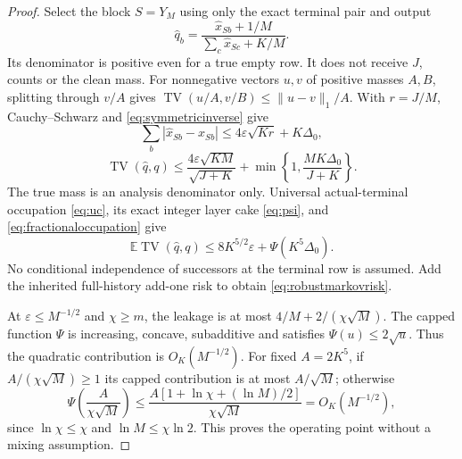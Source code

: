 \documentclass[11pt,letterpaper]{article}
\theoremstyle{definition}\newtheorem{definition}[theorem]{Definition}
\theoremstyle{remark}\newtheorem{remark}[theorem]{Remark}
\newcommand{\TV}{\operatorname{TV}}
\newcommand{\E}{\mathbb{E}}
\begin{document}
\begin{proof}
Select the block $S=Y_M$ using only the exact terminal pair and output
\[
 \widehat q_b=\frac{\widehat x_{Sb}+1/M}{\sum_c\widehat x_{Sc}+K/M}.
\]
Its denominator is positive even for a true empty row. It does not receive $J$, counts or the clean mass. For nonnegative vectors $u,v$ of positive masses $A,B$, splitting through $v/A$ gives
$\TV(u/A,v/B)\le\|u-v\|_1/A$.
With $r=J/M$, Cauchy--Schwarz and \eqref{eq:symmetricinverse} give
\[
 \sum_b|\widehat x_{Sb}-x_{Sb}|
 \le4\varepsilon\sqrt{Kr}+K\Delta_0,
\]
\[
 \TV(\widehat q,q)\le
 \frac{4\varepsilon\sqrt{KM}}{\sqrt{J+K}}
 +\min\left\{1,\frac{MK\Delta_0}{J+K}\right\}.
\]
The true mass is an analysis denominator only. Universal actual-terminal occupation \eqref{eq:uc}, its exact integer layer cake \eqref{eq:psi}, and \eqref{eq:fractionaloccupation} give
\[
 \E\TV(\widehat q,q)\le8K^{5/2}\varepsilon+\Psi(K^5\Delta_0).
\]
No conditional independence of successors at the terminal row is assumed. Add the inherited full-history add-one risk to obtain \eqref{eq:robustmarkovrisk}.

At $\varepsilon\le M^{-1/2}$ and $\chi\ge m$, the leakage is at most $4/M+2/(\chi\sqrt M)$. The capped function $\Psi$ is increasing, concave, subadditive and satisfies $\Psi(u)\le2\sqrt u$. Thus the quadratic contribution is $O_K(M^{-1/2})$. For fixed $A=2K^5$, if $A/(\chi\sqrt M)\ge1$ its capped contribution is at most $A/\sqrt M$; otherwise
\[
 \Psi\left(\frac A{\chi\sqrt M}\right)
 \le\frac{A[1+\ln\chi+(\ln M)/2]}{\chi\sqrt M}
 =O_K(M^{-1/2}),
\]
since $\ln\chi\le\chi$ and $\ln M\le\chi\ln2$. This proves the operating point without a mixing assumption.
\end{proof}
\end{document}
